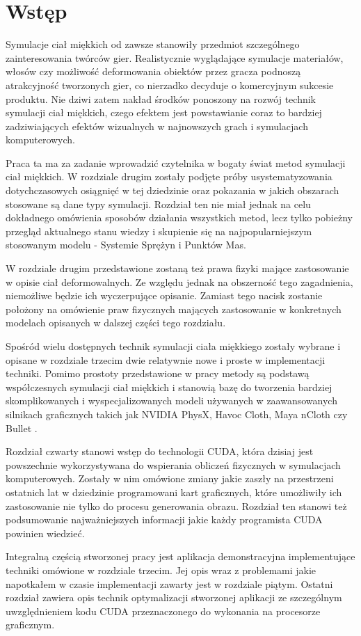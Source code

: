 \chapter{Wstęp}





Symulacje ciał miękkich od zawsze stanowiły przedmiot szczególnego
zainteresowania twórców gier. Realistycznie wyglądające symulacje materiałów,
włosów czy możliwość deformowania obiektów przez gracza podnoszą atrakcyjność
tworzonych gier, co nierzadko decyduje o komercyjnym sukcesie produktu.
Nie dziwi zatem nakład środków ponoszony na rozwój technik symulacji ciał
miękkich, czego efektem jest powstawianie coraz to bardziej zadziwiających
efektów wizualnych w najnowszych grach i symulacjach komputerowych.

Praca ta ma za zadanie wprowadzić czytelnika w bogaty świat metod symulacji ciał
miękkich. W rozdziale drugim zostały podjęte próby usystematyzowania
dotychczasowych osiągnięć w tej dziedzinie oraz pokazania w jakich obszarach
stosowane są dane typy symulacji. Rozdział ten nie miał jednak na celu
dokładnego omówienia sposobów działania wszystkich metod, lecz tylko pobieżny
przegląd aktualnego stanu wiedzy i skupienie się na najpopularniejszym
stosowanym modelu - Systemie Sprężyn i Punktów Mas.

W rozdziale drugim przedstawione zostaną też prawa fizyki mające zastosowanie
w opisie ciał deformowalnych. Ze względu jednak na obszerność tego zagadnienia,
niemożliwe będzie ich wyczerpujące opisanie. Zamiast tego nacisk zostanie
położony na omówienie praw fizycznych mających zastosowanie w konkretnych
modelach opisanych w dalszej części tego rozdziału.

Spośród wielu dostępnych technik symulacji ciała miękkiego zostały wybrane i
opisane w rozdziale trzecim dwie relatywnie nowe i proste w implementacji
techniki. Pomimo prostoty przedstawione w pracy metody są podstawą współczesnych
symulacji ciał miękkich i stanowią bazę do tworzenia bardziej skomplikowanych i
wyspecjalizowanych modeli używanych w zaawansowanych silnikach graficznych
takich jak NVIDIA PhysX, Havoc Cloth, Maya nCloth czy Bullet \cite{Liu:2013:FSM}.

Rozdział czwarty stanowi wstęp do technologii CUDA, która dzisiaj jest 
powszechnie wykorzystywana do wspierania obliczeń fizycznych w symulacjach
komputerowych. Zostały w nim omówione zmiany jakie zaszły na przestrzeni
ostatnich lat w dziedzinie programowani kart graficznych, które umożliwiły ich
zastosowanie nie tylko do procesu generowania obrazu. Rozdział ten stanowi też
podsumowanie najważniejszych informacji jakie każdy programista CUDA powinien
wiedzieć.

Integralną częścią stworzonej pracy jest aplikacja demonstracyjna implementujące
techniki omówione w rozdziale trzecim. Jej opis wraz z problemami jakie
napotkałem w czasie implementacji zawarty jest w rozdziale piątym. Ostatni
rozdział zawiera opis technik optymalizacji stworzonej aplikacji ze szczególnym
uwzględnieniem kodu CUDA przeznaczonego do wykonania na procesorze graficznym.

